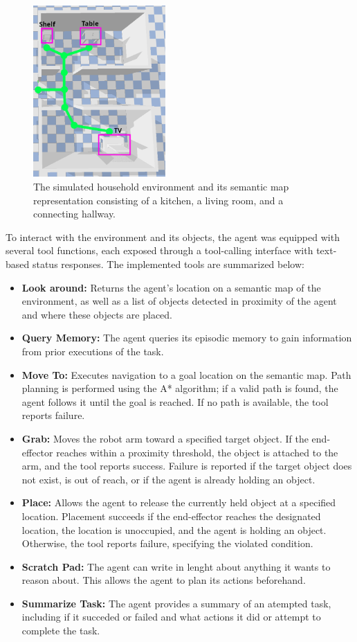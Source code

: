 \documentclass[../report.tex]{subfiles}
\begin{document}
\begin{figure}[h!]
	\centering
	\includegraphics[width=0.45\textwidth]{figures/environment.png}
	\caption{The simulated household environment and its semantic map representation consisting of a kitchen, a living room, and a connecting hallway.}
	\label{fig:environment}
\end{figure}

To interact with the environment and its objects, the agent was equipped with several tool functions, each exposed through a tool-calling interface with text-based status responses. The implemented tools are summarized below:
\begin{itemize}
	\item \textbf{Look around:} Returns the agent's location on a semantic map of the environment, as well as a list of objects detected in proximity of the agent and where these objects are placed.
	\item \textbf{Query Memory:} The agent queries its episodic memory to gain information from prior executions of the task.
	\item \textbf{Move To:} Executes navigation to a goal location on the semantic map. Path planning is performed using the A* algorithm; if a valid path is found, the agent follows it until the goal is reached. If no path is available, the tool reports failure.
	\item \textbf{Grab:} Moves the robot arm toward a specified target object. If the end-effector reaches within a proximity threshold, the object is attached to the arm, and the tool reports success. Failure is reported if the target object does not exist, is out of reach, or if the agent is already holding an object.
	\item \textbf{Place:} Allows the agent to release the currently held object at a specified location. Placement succeeds if the end-effector reaches the designated location, the location is unoccupied, and the agent is holding an object. Otherwise, the tool reports failure, specifying the violated condition.
	\item \textbf{Scratch Pad:} The agent can write in lenght about anything it wants to reason about. This allows the agent to plan its actions beforehand.
	\item \textbf{Summarize Task:} The agent provides a summary of an atempted task, including if it succeded or failed and what actions it did or attempt to complete the task.
\end{itemize}
\end{document}

